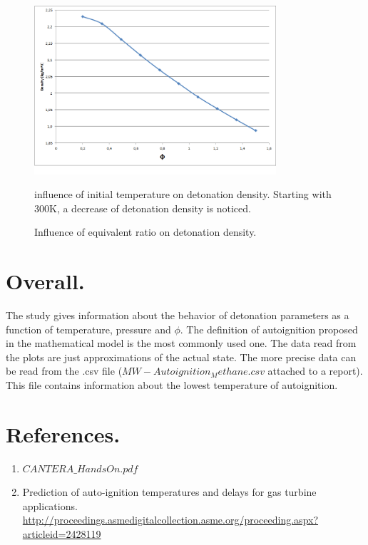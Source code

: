 \documentclass[11pt]{article}
\begin{document}
 \begin{figure} [H]
	\begin{center}
    	\includegraphics[width=0.8\textwidth]{ffi_density}
        \caption{Influence of equivalent ratio on detonation density.}
    \end{center}
\normalsize
{influence of initial temperature on detonation density. Starting with 300K, a decrease of detonation density is noticed. }
\end{figure}







\section{Overall.}
The study gives information about the behavior of detonation parameters as a function of temperature, pressure and $\phi$. The definition of autoignition proposed in the mathematical model is the most commonly used one. The data read from the plots are just approximations of the actual state. The more precise data can be read from the .csv file ($MW-Autoignition_Methane.csv$ attached to a report). This file contains information about the lowest temperature of autoignition.

\section{References.}
\begin{enumerate}
\item $CANTERA\_HandsOn.pdf$
\item Prediction of auto-ignition temperatures and delays for gas turbine applications. \\
\url{http://proceedings.asmedigitalcollection.asme.org/proceeding.aspx?articleid=2428119}
\end{enumerate}
\end{document}
